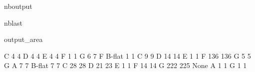 \documentclass[letterpaper,10pt,english]{sphinxmanual}
\begin{document}
\begin{sphinxuseclass}{nboutput}
\begin{sphinxuseclass}{nblast}
{\begin{sphinxuseclass}{output_area}
\begin{sphinxuseclass}{}
\begin{sphinxVerbatim}[commandchars=\\\{\}]
                   C                              4             4
                   D                              4             4
                   E                              4             4
                   F                              1             1
                   G                              6             7
F                  B-flat                         1             1
                   C                              9             9
                   D                             14            14
                   E                              1             1
                   F                            136           136
                   G                              5             5
G                  A                              7             7
                   B-flat                         7             7
                   C                             28            28
                   D                             21            23
                   E                              1             1
                   F                             14            14
                   G                            222           225
None               A                              1             1
                   G                              1             1


\end{sphinxVerbatim}
\end{sphinxuseclass}
\end{sphinxuseclass}}
\end{sphinxuseclass}
\end{sphinxuseclass}
\end{document}
